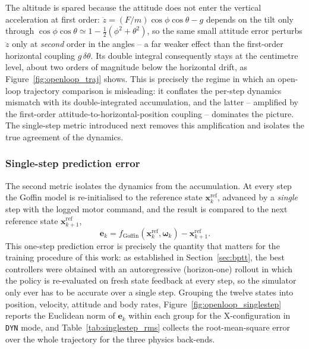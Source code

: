 \documentclass[11pt,a4paper]{article}
\theoremstyle{remark}
\numberwithin{equation}{section}
\begin{document}
The altitude is spared because the attitude does not enter the vertical
acceleration at first order: $\ddot{z} = (F/m)\cos\phi\cos\theta - g$ depends on
the tilt only through $\cos\phi\cos\theta \simeq 1 - \tfrac{1}{2}(\phi^2+\theta^2)$,
so the same small attitude error perturbs $\ddot{z}$ only at \emph{second} order
in the angles -- a far weaker effect than the first-order horizontal coupling
$g\,\delta\theta$. Its double integral consequently stays at the centimetre level,
about two orders of magnitude below the horizontal drift, as
Figure~\ref{fig:openloop_traj} shows. This is precisely the regime in which an
open-loop trajectory comparison is misleading: it conflates the per-step dynamics
mismatch with its double-integrated accumulation, and the latter -- amplified by
the first-order attitude-to-horizontal-position coupling -- dominates the picture.
The single-step metric introduced next removes this amplification and isolates the
true agreement of the dynamics.

\subsubsection*{Single-step prediction error}

The second metric isolates the dynamics from the accumulation. At every step the
Goffin model is re-initialised to the reference state $\mathbf{x}_k^{\mathrm{ref}}$,
advanced by a \emph{single} step with the logged motor command, and the result is
compared to the next reference state $\mathbf{x}_{k+1}^{\mathrm{ref}}$,
\begin{equation}
\mathbf{e}_k = f_{\mathrm{Goffin}}\!\left(\mathbf{x}_k^{\mathrm{ref}},
\boldsymbol{\omega}_k\right) - \mathbf{x}_{k+1}^{\mathrm{ref}}.
\label{eq:single_step_err}
\end{equation}
This one-step prediction error is precisely the quantity that matters for the
training procedure of this work: as established in Section~\ref{sec:bptt}, the
best controllers were obtained with an autoregressive (horizon-one) rollout in
which the policy is re-evaluated on fresh state feedback at every step, so the
simulator only ever has to be accurate over a single step. Grouping the twelve
states into position, velocity, attitude and body rates,
Figure~\ref{fig:openloop_singlestep} reports the Euclidean norm of $\mathbf{e}_k$
within each group for the X-configuration in \texttt{DYN} mode, and
Table~\ref{tab:singlestep_rms} collects the root-mean-square error over the whole
trajectory for the three physics back-ends.
\end{document}
